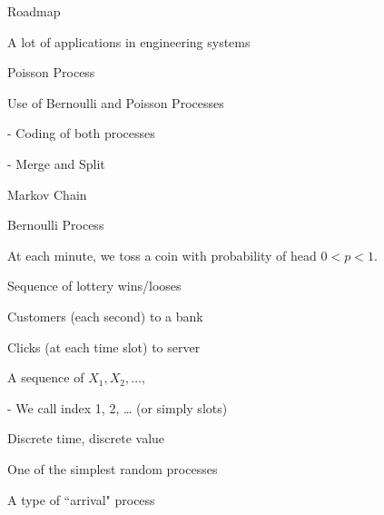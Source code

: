\documentclass[fleqn,aspectratio=169]{beamer}
\begin{document}
\begin{frame}{Roadmap}

\plitemsep 0.1in

\bci 
\item A lot of applications in engineering systems


\bigskip

\item {}

\medskip
\item {}
\item Poisson Process
\item Use of Bernoulli and Poisson Processes

- Coding of both processes

- Merge and Split

\medskip
\item Markov Chain

\eci 

\end{frame}


\begin{frame}{Bernoulli Process}

\plitemsep 0.1in
\bci

\item<1-> At each minute, we toss a coin with probability of head $0<p<1.$

\bci
\item<2-> Sequence of lottery wins/looses
\item<2-> Customers (each second) to a bank
\item<2-> Clicks (at each time slot) to server
\eci


\item<3-> A sequence of  $X_1, X_2, \ldots, $

- We call index 1, 2, \ldots {} (or simply slots)


\item<4-> Discrete time, discrete value

\item<5-> One of the simplest random processes

\item<5-> A type of ``arrival" process

\eci

\end{frame}
\end{document}
